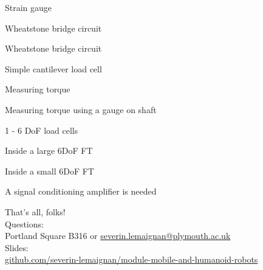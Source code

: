 \documentclass[compress]{beamer}
\begin{document}
{
    \begin{frame}{Strain gauge}
    \end{frame}
}

{
    \begin{frame}{Wheatstone bridge circuit}
    \end{frame}
}

{
    \begin{frame}{Wheatstone bridge circuit}
    \end{frame}
}

{
    \begin{frame}{Simple cantilever load cell}
    \end{frame}
}

{
    \begin{frame}{Measuring torque}
    \end{frame}
}

{
    \begin{frame}{Measuring torque using a gauge on shaft}
    \end{frame}
}

{
    \begin{frame}{1 - 6 DoF load cells}
    \end{frame}
}

{
    \begin{frame}{Inside a large 6DoF FT}
    \end{frame}
}

{
    \begin{frame}{Inside a small 6DoF FT}
    \end{frame}
}

{
    \begin{frame}{A signal conditioning amplifier is needed}
    \end{frame}
}


\begin{frame}{}
    \begin{center}
        \Large
        That's all, folks!\\[2em]
        \normalsize
        Questions:\\
        Portland Square B316 or \url{severin.lemaignan@plymouth.ac.uk} \\[1em]

        Slides:\\ \href{https://github.com/severin-lemaignan/module-mobile-and-humanoid-robots}{\small github.com/severin-lemaignan/module-mobile-and-humanoid-robots}

    \end{center}
\end{frame}
\end{document}
